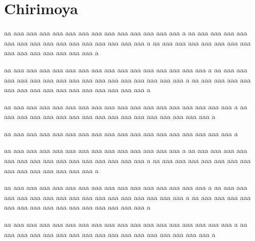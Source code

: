 \section{Chirimoya}


aa aaa aaa aaa aaa aaa aaa aaa aaa aaa aaa aaa aaa aaa a
aa aaa aaa aaa aaa aaa aaa aaa aaa aaa aaa aaa aaa aaa aaa aaa a
aa aaa aaa aaa aaa aaa aaa aaa aaa aaa aaa aaa aaa aaa aaa a

aa aaa aaa aaa aaa aaa aaa aaa aaa aaa aaa aaa aaa aaa aaa aaa a
aa aaa aaa aaa aaa aaa aaa aaa aaa aaa aaa aaa aaa aaa aaa aaa aaa a
aa aaa aaa aaa aaa aaa aaa aaa aaa aaa aaa aaa aaa aaa aaa aaa a

aa aaa aaa aaa aaa aaa aaa aaa aaa aaa aaa aaa aaa aaa aaa aaa aaa aaa a
aa aaa aaa aaa aaa aaa aaa aaa aaa aaa aaa aaa aaa aaa aaa aaa aaa a

aa aaa aaa aaa aaa aaa aaa aaa aaa aaa aaa aaa aaa aaa aaa aaa aaa aaa a

aa aaa aaa aaa aaa aaa aaa aaa aaa aaa aaa aaa aaa aaa a
aa aaa aaa aaa aaa aaa aaa aaa aaa aaa aaa aaa aaa aaa aaa aaa a
aa aaa aaa aaa aaa aaa aaa aaa aaa aaa aaa aaa aaa aaa aaa a

aa aaa aaa aaa aaa aaa aaa aaa aaa aaa aaa aaa aaa aaa aaa aaa a
aa aaa aaa aaa aaa aaa aaa aaa aaa aaa aaa aaa aaa aaa aaa aaa aaa a
aa aaa aaa aaa aaa aaa aaa aaa aaa aaa aaa aaa aaa aaa aaa aaa a

aa aaa aaa aaa aaa aaa aaa aaa aaa aaa aaa aaa aaa aaa aaa aaa aaa aaa a
aa aaa aaa aaa aaa aaa aaa aaa aaa aaa aaa aaa aaa aaa aaa aaa aaa a